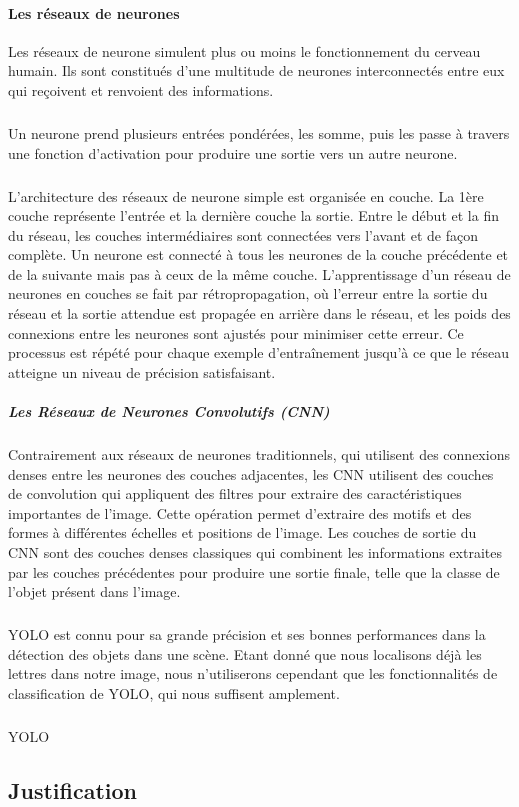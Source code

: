 \documentclass[a4paper]{article}
\begin{document}
				\paragraph{Les réseaux de neurones}
					Les réseaux de neurone simulent plus ou moins le fonctionnement du cerveau humain. Ils sont constitués d'une multitude de neurones interconnectés entre eux qui reçoivent et renvoient des informations.
					\subparagraph{} Un neurone prend plusieurs entrées pondérées, les somme, puis les passe à travers une fonction d'activation pour produire une sortie vers un autre neurone.
					\subparagraph{} L'architecture des réseaux de neurone simple est organisée en couche. La 1ère couche représente l'entrée et la dernière couche la sortie.
					Entre le début et la fin du réseau, les couches intermédiaires sont connectées vers l'avant et de façon complète. Un neurone est connecté à tous les neurones de la couche précédente et de la suivante mais pas à ceux de la même couche.
					L'apprentissage d'un réseau de neurones en couches se fait par rétropropagation, où l'erreur entre la sortie du réseau et la sortie attendue est propagée en arrière dans le réseau, et les poids des connexions entre les neurones sont ajustés pour minimiser cette erreur.
					Ce processus est répété pour chaque exemple d'entraînement jusqu'à ce que le réseau atteigne un niveau de précision satisfaisant.	
						
					\subparagraph{Les Réseaux de Neurones Convolutifs (CNN)} 
					Contrairement aux réseaux de neurones traditionnels, qui utilisent des connexions denses entre les neurones des couches adjacentes, les CNN utilisent des couches de convolution qui appliquent des filtres pour extraire des caractéristiques importantes de l'image.
					Cette opération permet d'extraire des motifs et des formes à différentes échelles et positions de l'image.
					Les couches de sortie du CNN sont des couches denses classiques qui combinent les informations extraites par les couches précédentes pour produire une sortie finale, telle que la classe de l'objet présent dans l'image.

					\subparagraph{} YOLO est connu pour sa grande précision et ses bonnes performances dans la détection des objets dans une scène. Etant donné que nous localisons déjà les lettres dans notre image, nous n'utiliserons cependant que les fonctionnalités de classification de YOLO, qui nous suffisent amplement.

					\subparagraph{} YOLO 

		\subsection*{Justification}
\end{document}
